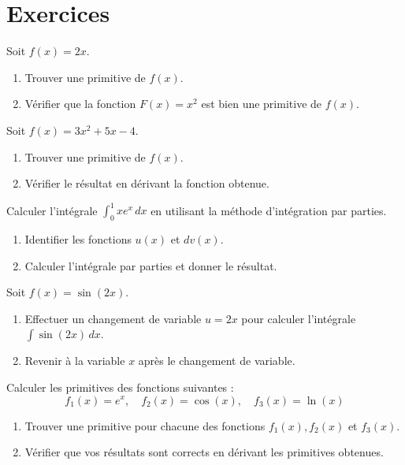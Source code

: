 \section{Exercices}
\begin{exercice}
Soit \( f(x) = 2x \).
\begin{enumerate}
    \item Trouver une primitive de \( f(x) \).
    \item Vérifier que la fonction \( F(x) = x^2 \) est bien une primitive de \( f(x) \).
\end{enumerate}
\end{exercice}

\begin{exercice}
Soit \( f(x) = 3x^2 + 5x - 4 \).
\begin{enumerate}
    \item Trouver une primitive de \( f(x) \).
    \item Vérifier le résultat en dérivant la fonction obtenue.
\end{enumerate}
\end{exercice}

\begin{exercice}
Calculer l'intégrale \( \int_0^1 x e^x \, dx \) en utilisant la méthode d'intégration par parties.
\begin{enumerate}
    \item Identifier les fonctions \( u(x) \) et \( dv(x) \).
    \item Calculer l'intégrale par parties et donner le résultat.
\end{enumerate}
\end{exercice}

\begin{exercice}
Soit \( f(x) = \sin(2x) \).
\begin{enumerate}
    \item Effectuer un changement de variable \( u = 2x \) pour calculer l'intégrale \( \int \sin(2x) \, dx \).
    \item Revenir à la variable \( x \) après le changement de variable.
\end{enumerate}
\end{exercice}

\begin{exercice}
Calculer les primitives des fonctions suivantes :
\[
f_1(x) = e^x, \quad f_2(x) = \cos(x), \quad f_3(x) = \ln(x)
\]
\begin{enumerate}
    \item Trouver une primitive pour chacune des fonctions \( f_1(x), f_2(x) \) et \( f_3(x) \).
    \item Vérifier que vos résultats sont corrects en dérivant les primitives obtenues.
\end{enumerate}
\end{exercice}


